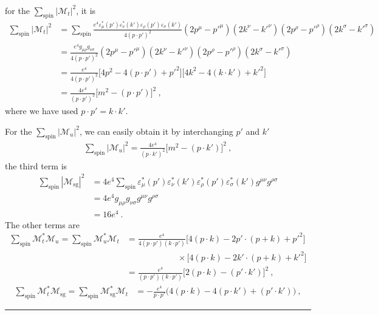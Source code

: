 \documentclass[12pt]{report}
\numberwithin{problemname}{chapter}
\newenvironment{solution}{\vspace{1em}\par\noindent{\large\textbf{\textsc{Solution}}}\par}{\vspace{1em}\hrule}
\begin{document}
\begin{solution}
\begin{align}
    \end{align}
    for the $\sum_{\text{spin}}|\mathcal{M}_t|^2$, it is
    \begin{align}
        \sum_{\text{spin}}|\mathcal{M}_t|^2&=\sum_{\text{spin}}\frac{e^4\varepsilon^*_{\mu}(p')\varepsilon^*_{\nu}(k')\varepsilon_{\rho}(p')\varepsilon_{\sigma}(k')}{4(p\cdot p')^2}(2p^{\mu}-p'^{\mu})(2k^{\nu}-k'^{\nu})(2p^{\rho}-p'^{\rho})(2k^{\sigma}-k'^{\sigma}) \nonumber \\
        &=\frac{e^4g_{\mu\rho}g_{\nu\sigma}}{4(p\cdot p')^2}(2p^{\mu}-p'^{\mu})(2k^{\nu}-k'^{\nu})(2p^{\rho}-p'^{\rho})(2k^{\sigma}-k'^{\sigma}) \nonumber \\
        &=\frac{e^4}{4(p\cdot p')^2}\bigg[4p^2-4(p\cdot p')+p'^2\bigg]\bigg[4k^2-4(k\cdot k')+k'^2\bigg] \nonumber \\
        &=\frac{4e^4}{(p\cdot p')^2}\bigg[m^2-(p\cdot p')\bigg]^2\ ,
    \end{align}
    where we have used $p\cdot p'=k\cdot k'$. \par
    For the $\sum_{\text{spin}}|\mathcal{M}_u|^2$, we can easily obtain it by interchanging $p'$ and $k'$
    \begin{align}
        \sum_{\text{spin}}|\mathcal{M}_u|^2=\frac{4e^4}{(p\cdot k')^2}\bigg[m^2-(p\cdot k')\bigg]^2\ ,
    \end{align}
    the third term is
    \begin{align}
        \sum_{\text{spin}}|\mathcal{M}_{\text{sg}}|^2&=4e^4\sum_{\text{spin}}\varepsilon^*_{\mu}(p')\varepsilon^*_{\nu}(k')\varepsilon^*_{\rho}(p')\varepsilon^*_{\sigma}(k')g^{\mu\nu}g^{\rho\sigma} \nonumber \\
        &=4e^4g_{\mu\rho}g_{\nu\sigma}g^{\mu\nu}g^{\rho\sigma} \nonumber \\
        &=16e^4\ .
    \end{align}
    The other terms are
    \begin{align}
        \sum_{\text{spin}}\mathcal{M}_t^*\mathcal{M}_u=\sum_{\text{spin}}\mathcal{M}_u^*\mathcal{M}_t&=\frac{e^4}{4(p\cdot p')(k\cdot p')}\bigg[4(p\cdot k)-2p'\cdot(p+k)+p'^2\bigg] \nonumber \\
        &\quad\quad\quad\quad\quad\quad \times \bigg[4(p\cdot k)-2k'\cdot(p+k)+k'^2\bigg] \nonumber \\
        &=\frac{e^4}{(p\cdot p')(k\cdot p')}\bigg[2(p\cdot k)-(p'\cdot k')\bigg]^2\ ,
    \end{align}
    \begin{align}
        \sum_{\text{spin}}\mathcal{M}_t^*\mathcal{M}_{\text{sg}}=\sum_{\text{spin}}\mathcal{M}_{\text{sg}}^*\mathcal{M}_t&=-\frac{e^4}{p\cdot p'}\bigg(4(p\cdot k)-4(p\cdot k')+(p'\cdot k')\bigg)\ ,

\end{align}
\end{solution}
\end{document}
